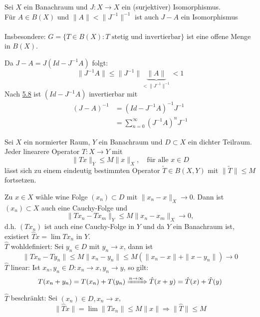 \begin{kor} \label{kor:5.9}
	Sei $X$ ein Banachraum und $J: X \rightarrow X$ ein (surjektiver) Isomorphismus. \\
	Für $A \in B(X)$ und $\| A \| < \| J^{-1} \|^{-1}$ ist auch $J - A$ ein Isomorphismus \\ \\
	Insbesondere: $G = \{ T \in B(X): T \text{ stetig und invertierbar} \}$ ist eine offene Menge in $B(X)$.
	\begin{beweis}
		Da $J - A = J (Id - J^{-1}A) $ folgt:
		\[ \| J^{-1} A \| \leq \| J^{-1} \| \underbrace{\| A \|}_{< \| J^{-1} \|^{-1}} < 1 \]
		Nach \hyperref[prop:5.8-NeumannscheReihe]{5.8} ist $(Id - J^{-1} A)$ invertierbar mit
			\begin{align*}
				(J - A)^{-1} & = (Id - J^{-1} A)^{-1} J^{-1} \\
					& = \sum_{n = 0}^{\infty} (J^{-1} A)^{n} J^{-1}
			\end{align*}
	\end{beweis}
\end{kor}


\begin{prop} \label{prop:5.10}
	Sei $X$ ein normierter Raum, $Y$ ein Banachraum und $D \subset X$ ein dichter Teilraum. \\
	Jeder linearere Operator $T: X \rightarrow Y$ mit
		\[ \| T x \|_{Y} \leq M \| x \|_{X}, \quad \text{für alle } x \in D \]
	lässt sich zu einem eindeutig bestimmten Operator $ \tilde T \in B(X, Y)$ mit $\| \tilde T \| \leq M	$ fortsetzen.	
\end{prop} 

\begin{beweis}
	Zu $x \in X$ wähle wine Folge $(x_{n}) \subset D$ mit $\| x_{n} - x \|_{X} \rightarrow 0$. Dann ist $(x_{n}) \subset X$ auch eine Cauchy-Folge und
	\[ \| Tx_{n} - Tx_{m} \|_{Y} \leq M \|x_{n} - x_{m} \|_{X} \rightarrow 0,  \]
	d.h. $(Tx_{n})$ ist auch eine Cauchy-Folge in $Y$ und da $Y$ ein Banachraum ist, existiert $\hat T x = \lim T x_{n}$ in $Y$. \\
	$\hat T$ wohldefiniert: Sei $y_{n} \in D$ mit $y_{n} \rightarrow x$, dann ist 
		\[ \| T x_{n} - T y_{n} \| \leq M \| x_{n} - y_{n} \| \leq M \left( \| x_{n} - x \| + \| x - y_{n} \| \right) \rightarrow 0 \]
	$\hat T$ linear: Ist $x_{n}, y_{n} \in D : x_{n} \rightarrow x, y_{n} \rightarrow y$, so gilt:
		\[ T(x_{n} + y_{n}) = T(x_{n}) + T(y_{n}) \xRightarrow[]{n \rightarrow \infty} \hat T(x + y) = \hat T(x) + \hat T(y) \]
	$\hat T$ beschränkt: Sei $(x_{n}) \in D, x_{n} \rightarrow x$,
	\[ \| \hat T x \| = \lim \| T x_{n} \| \leq M \| x \| \Rightarrow \| \hat T \| \leq M \]
\end{beweis}


